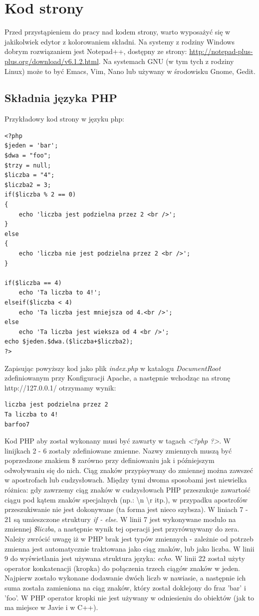 \documentclass[a4paper,10pt]{article}
\begin{document}
\section{Kod strony}
Przed przystąpieniem do pracy nad kodem strony, warto wyposażyć się w jakikolwiek edytor z kolorowaniem składni. Na systemy z rodziny Windows dobrym rozwiązaniem jest Notepad++, dostępny ze strony: \href{http://notepad-plus-plus.org/download/v6.1.2.html}{http://notepad-plus-plus.org/download/v6.1.2.html}. Na systemach GNU (w tym tych z rodziny Linux) może to być Emacs, Vim, Nano lub używany w środowisku Gnome, Gedit.
\subsection{Składnia języka PHP}
Przykładowy kod strony w języku php: \\
\begin{verbatim}
<?php
$jeden = 'bar';
$dwa = "foo";
$trzy = null;
$liczba = "4";
$liczba2 = 3;
if($liczba % 2 == 0)
{
	echo 'liczba jest podzielna przez 2 <br />';
}
else
{
	echo 'liczba nie jest podzielna przez 2 <br />';
}

if($liczba == 4)
	echo 'Ta liczba to 4!';
elseif($liczba < 4)
	echo 'Ta liczba jest mniejsza od 4.<br />';
else
	echo 'Ta liczba jest wieksza od 4 <br />';
echo $jeden.$dwa.($liczba+$liczba2);
?>
\end{verbatim}
Zapisując powyższy kod jako plik \textit{index.php} w katalogu \textit{DocumentRoot} zdefiniowanym przy Konfiguracji Apache, a następnie wchodząc na stronę http://127.0.0.1/ otrzymamy wynik:
\begin{verbatim}
liczba jest podzielna przez 2
Ta liczba to 4!
barfoo7
\end{verbatim}
Kod PHP aby został wykonany musi być zawarty w tagach \textit{<?php ?>}.
W linijkach 2 - 6 zostały zdefiniowane zmienne. Nazwy zmiennych muszą być poprzedzone znakiem \$ zarówno przy definiowaniu jak i późniejszym odwoływaniu się do nich. Ciąg znaków przypisywany do zmiennej można zawszeć w apostrofach lub cudzysłowach. Między tymi dwoma sposobami jest niewielka różnica: gdy zawrzemy ciąg znaków w cudzysłowach PHP przeszukuje zawartość ciągu pod kątem znaków specjalnych (np.: \textbackslash n \textbackslash r itp.), w przypadku apostrofów przeszukiwanie nie jest dokonywane (ta forma jest nieco szybsza). W liniach 7 - 21 są umieszczone struktury \textit{if - else}. W linii 7 jest wykonywane modulo na zmiennej \textit{\$liczba}, a następnie wynik tej operacji jest przyrównywany do zera. Należy zwrócić uwagę iż w PHP brak jest typów zmiennych - zależnie od potrzeb zmienna jest automatycznie traktowana jako ciąg znaków, lub jako liczba. W linii 9 do wyświetlania jest używana struktura języka: \textit{echo}. W linii 22 został użyty operator konkatenacji (kropka) do połączenia trzech ciągów znaków w jeden. Najpierw zostało wykonane dodawanie dwóch liczb w nawiasie, a następnie ich suma została zamieniona na ciąg znaków, który został doklejony do fraz 'bar' i 'foo'. W PHP operator kropki nie jest używany w odniesieniu do obiektów (jak to ma miejsce w Javie i w C++). \\
\end{document}
